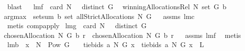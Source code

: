 \begin{isabellebody}
\ blast%
\endisatagproof
{\isafoldproof}%
%
\isadelimproof
%
\endisadelimproof
\ \isanewline
\isanewline
{}\isamarkupfalse%
\ lm{}{}f{\isacharcolon}\ \ {\isachardoublequoteopen}card\ N\ {\isachargreater}\ {}{\isachardoublequoteclose}\ {\isachardoublequoteopen}distinct\ G{\isachardoublequoteclose}\ \ \isanewline
{\isachardoublequoteopen}winningAllocationsRel\ N\ {\isacharparenleft}set\ G{\isacharparenright}\ b\ {\isacharequal}\ \isanewline
{\isacharparenleft}argmax\ {\isasymcirc}\ setsum{\isacharparenright}\ b\ {\isacharparenleft}set\ {\isacharparenleft}allStrictAllocations\ N\ G{\isacharparenright}{\isacharparenright}{\isachardoublequoteclose}%
\isadelimproof
\ %
\endisadelimproof
%
\isatagproof
{}\isamarkupfalse%
\ assms\ lm{}{}c\ \isamarkupfalse%
\ {\isacharparenleft}metis\ comp{\isacharunderscore}apply{\isacharparenright}%
\endisatagproof
{\isafoldproof}%
%
\isadelimproof
%
\endisadelimproof
\isanewline
\isanewline
{}\isamarkupfalse%
\ lm{}{}g{\isacharcolon}\ \ {\isachardoublequoteopen}card\ N\ {\isachargreater}\ {}{\isachardoublequoteclose}\ {\isachardoublequoteopen}distinct\ G{\isachardoublequoteclose}\ \isanewline
{\isachardoublequoteopen}chosenAllocation{\isacharprime}\ N\ G\ b\ r\ {\isacharequal}\ chosenAllocation\ N\ G\ b\ r{\isachardoublequoteclose}%
\isadelimproof
\ %
\endisadelimproof
%
\isatagproof
{}\isamarkupfalse%
\ assms\ lm{}{}f\ \isamarkupfalse%
\ metis%
\endisatagproof
{\isafoldproof}%
%
\isadelimproof
%
\endisadelimproof
\ \isanewline
{}\isamarkupfalse%
\ lm{}{}b{\isacharcolon}\ \ {\isachardoublequoteopen}x\ {\isasymin}\ {\isacharparenleft}N\ {\isasymtimes}\ {\isacharparenleft}Pow\ G\ {\isacharminus}\ {\isacharbraceleft}{\isacharbraceleft}{\isacharbraceright}{\isacharbraceright}{\isacharparenright}{\isacharparenright}{\isachardoublequoteclose}\ \ {\isachardoublequoteopen}tiebids{\isacharprime}\ a\ N\ G\ x\ {\isacharequal}\ tiebids\ a\ N\ G\ x{\isachardoublequoteclose}\ {\isacharparenleft}\ {\isachardoublequoteopen}{\isacharquery}L{\isacharequal}{\isacharunderscore}{\isachardoublequoteclose}{\isacharparenright}\ \isanewline
%
\isadelimproof
%
\endisadelimproof
%
\isatagproof
{}\isamarkupfalse%
\ {\isacharminus}\ \isanewline
{}\isamarkupfalse%

\end{isabellebody}
